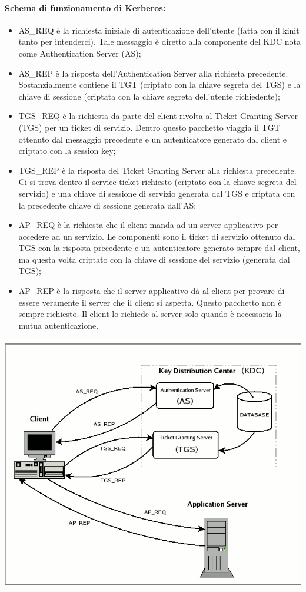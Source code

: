 \documentclass[a4paper]{report}
\begin{document}
\paragraph{Schema di funzionamento di Kerberos:}
\begin{itemize}
\item AS\_REQ è la richiesta iniziale di autenticazione dell'utente (fatta con il kinit tanto per
intenderci). Tale messaggio è diretto alla componente del KDC nota come Authentication Server
(AS);
\item AS\_REP è la risposta dell'Authentication Server alla richiesta precedente. Sostanzialmente
contiene il TGT (criptato con la chiave segreta del TGS) e la chiave di sessione (criptata con la
chiave segreta dell'utente richiedente);
\item TGS\_REQ è la richiesta da parte del client rivolta al Ticket Granting Server (TGS) per un ticket
di servizio. Dentro questo pacchetto viaggia il TGT ottenuto dal messaggio precedente e un
autenticatore generato dal client e criptato con la session key;
\item TGS\_REP è la risposta del Ticket Granting Server alla richiesta precedente. Ci si trova dentro
il service ticket richiesto (criptato con la chiave segreta del servizio) e una chiave di sessione di
servizio generata dal TGS e criptata con la precedente chiave di sessione generata dall'AS;
\item AP\_REQ è la richiesta che il client manda ad un server applicativo per accedere ad un servizio.
Le componenti sono il ticket di servizio ottenuto dal TGS con la risposta precedente e un
autenticatore generato sempre dal client, ma questa volta criptato con la chiave di sessione del
servizio (generata dal TGS);
\item AP\_REP è la risposta che il server applicativo dà al client per provare di essere veramente il
server che il client si aspetta. Questo pacchetto non è sempre richiesto. Il client lo richiede al
server solo quando è necessaria la mutua autenticazione.
\end{itemize}
\begin{center}
\includegraphics[scale=0.5]{kerberos.png}
\end{center}
\end{document}
